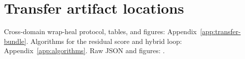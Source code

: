
\section{Transfer artifact locations}
\label{app:transfer-pilot}

Cross-domain wrap-heal protocol, tables, and figures:
Appendix~\ref{app:transfer-bundle}.
Algorithms for the residual score and hybrid loop: Appendix~\ref{app:algorithms}.
Raw JSON and figures:
.
